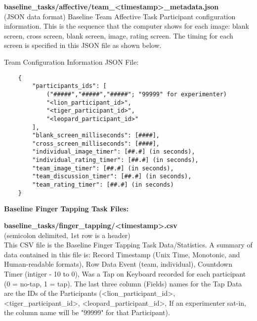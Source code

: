 \begin{description}
\medskip
\item\textbf{baseline\_tasks/affective/team\_<timestamp>\_metadata.json}\\(JSON data format)
Baseline Team Affective Task Participant configuration information. This is the sequence that the computer shows for each image: blank screen, cross screen, blank screen, image, rating screen. The timing for each screen is specified in this JSON file as shown below.

Team Configuration Information JSON File:
\begin{verbatim}
    {
        "participants_ids": [
            ("#####","#####","#####"; "99999" for experimenter)
            "<lion_participant_id>",
            "<tiger_participant_id>",
            "<leopard_participant_id>"
        ],
        "blank_screen_milliseconds": [####],
        "cross_screen_milliseconds": [####],
        "individual_image_timer": [##.#] (in seconds),
        "individual_rating_timer": [##.#] (in seconds),
        "team_image_timer": [##.#] (in seconds),
        "team_discussion_timer": [##.#] (in seconds),
        "team_rating_timer": [##.#] (in seconds)
    }
\end{verbatim}



\bigskip\item\textbf{Baseline Finger Tapping Task Files:}
\medskip
\item\textbf{baseline\_tasks/finger\_tapping/<timestamp>.csv}\\(semicolon delimited, 1st row is a header)\\
This CSV file is the Baseline Finger Tapping Task Data/Statistics. A summary of data contained in this file is: Record Timestamp (Unix Time, Monotonic, and Human-readable formats), Row Data Event (team, individual), Countdown Timer (intiger - 10 to 0), Was a Tap on Keyboard recorded for each participant (0 = no-tap, 1 = tap). The last three column (Fields) names for the Tap Data are the IDs of the Participants (<lion\_participant\_id>, <tiger\_participant\_id>, <leopard\_participant\_id>, If an experimenter sat-in, the column name will be "99999" for that Participant).


\end{description}
